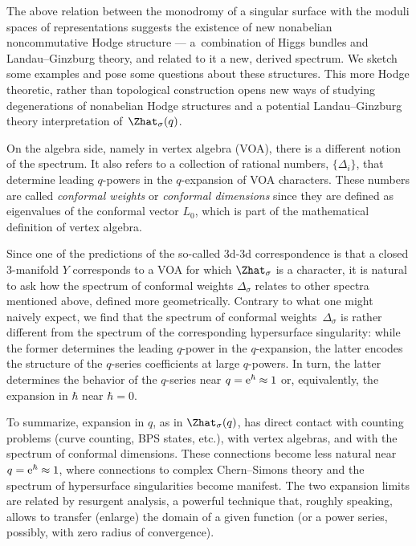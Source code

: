 \documentclass[10pt,a4paper]{amsart}
\begin{document}
The above relation between the monodromy of a singular surface with the moduli spaces of representations suggests the existence of new nonabelian noncommutative Hodge structure --- a~combination of Higgs bundles and Landau--Ginzburg theory, and related to it a new, derived spectrum. We sketch some examples and pose some questions about these structures. This more Hodge theoretic, rather than topological construction opens new ways of studying degenerations of nonabelian Hodge structures and a potential Landau--Ginzburg theory interpretation of~$\Zhat_{\sigma}(q)$.

On the algebra side, namely in vertex algebra (VOA), there is a different notion of the spectrum. It also refers to a collection of rational numbers, $\{ \Delta_i \}$, that determine leading $q$-powers in the $q$-expansion of VOA characters. These numbers are called {\it conformal weights} or {\it conformal dimensions} since they are defined as eigenvalues of the conformal vector $L_0$, which is part of the mathematical definition of vertex algebra.

Since one of the predictions of the so-called 3d-3d correspondence is that a closed 3-manifold $Y$ corresponds to a VOA \cite{CCFGH18, CCFFGHP22, Sug22} for which $\Zhat_{\sigma}$ is a character, it is natural to ask how the spectrum of conformal weights $\Delta_{\sigma}$ relates to other spectra mentioned above, defined more geometrically. Contrary to what one might naively expect, we find that the spectrum of conformal weights~$\Delta_{\sigma}$ is rather different from the spectrum of the corresponding hypersurface singularity: while the former determines the leading $q$-power in the $q$-expansion, the latter encodes the structure of the $q$-series coefficients at large $q$-powers. In turn, the latter determines the behavior of the $q$-series near $q = {\rm e}^{\hbar} \approx 1$ or, equivalently, the expansion in $\hbar$ near $\hbar = 0$.

To summarize, expansion in $q$, as in $\Zhat_{\sigma} (q)$, has direct contact with counting problems (curve counting, BPS states, etc.), with vertex algebras, and with the spectrum of conformal dimensions. These connections become less natural near $q = {\rm e}^{\hbar} \approx 1$, where connections to complex Chern--Simons theory and the spectrum of hypersurface singularities become manifest. The two expansion limits are related by resurgent analysis, a powerful technique that, roughly speaking, allows to transfer (enlarge) the domain of a given function (or a power series, possibly, with zero radius of convergence).
\end{document}

